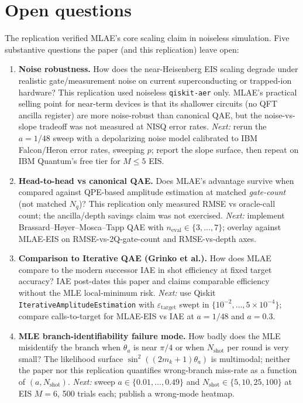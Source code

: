 \section{Open questions}
The replication verified MLAE's core scaling claim in noiseless simulation.
Five substantive questions the paper (and this replication) leave open:

\begin{enumerate}
  \item \textbf{Noise robustness.} How does the near-Heisenberg EIS scaling
        degrade under realistic gate/measurement noise on current
        superconducting or trapped-ion hardware?  This replication used
        noiseless \texttt{qiskit-aer} only.  MLAE's practical selling point
        for near-term devices is that its shallower circuits (no QFT
        ancilla register) are more noise-robust than canonical QAE, but
        the noise-vs-slope tradeoff was not measured at NISQ error rates.
        \emph{Next:} rerun the $a=1/48$ sweep with a depolarizing noise
        model calibrated to IBM Falcon/Heron error rates, sweeping $p$;
        report the slope surface, then repeat on IBM Quantum's free tier
        for $M\le 5$ EIS.

  \item \textbf{Head-to-head vs canonical QAE.} Does MLAE's advantage survive
        when compared against QPE-based amplitude estimation at matched
        \emph{gate-count} (not matched $N_q$)?  This replication only
        measured RMSE vs oracle-call count; the ancilla/depth savings claim
        was not exercised.  \emph{Next:} implement Brassard--H\o yer--Mosca--Tapp
        QAE with $n_{\text{eval}} \in \{3,\dots,7\}$; overlay against
        MLAE-EIS on RMSE-vs-2Q-gate-count and RMSE-vs-depth axes.

  \item \textbf{Comparison to Iterative QAE (Grinko et al.).} How does MLAE
        compare to the modern successor IAE in shot efficiency at fixed
        target accuracy?  IAE post-dates this paper and claims comparable
        efficiency without the MLE local-minimum risk.  \emph{Next:} use
        Qiskit \texttt{IterativeAmplitudeEstimation} with
        $\varepsilon_{\text{target}}$ swept in $\{10^{-2},\dots,5\!\times\!10^{-4}\}$;
        compare calls-to-target for MLAE-EIS vs IAE at $a=1/48$ and $a=0.3$.

  \item \textbf{MLE branch-identifiability failure mode.} How badly does the
        MLE misidentify the branch when $\theta_a$ is near $\pi/4$ or when
        $N_{\text{shot}}$ per round is very small?  The likelihood surface
        $\sin^{2}((2m_k+1)\theta_a)$ is multimodal; neither the paper nor
        this replication quantifies wrong-branch miss-rate as a function
        of $(a, N_{\text{shot}})$.  \emph{Next:} sweep $a\in\{0.01,\dots,0.49\}$
        and $N_{\text{shot}}\in\{5,10,25,100\}$ at EIS $M=6$, 500 trials
        each; publish a wrong-mode heatmap.


\end{enumerate}
